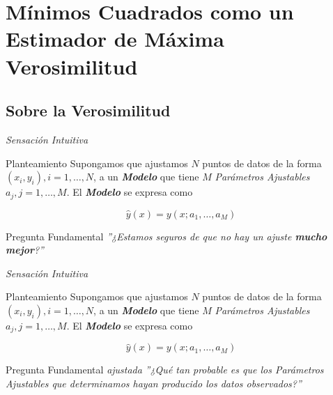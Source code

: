 \documentclass[11pt]{beamer}
\begin{document}
\section{Mínimos Cuadrados como un Estimador de Máxima Verosimilitud}
\begin{frame} 
\tableofcontents[currentsection] %
\end{frame}

\subsection{Sobre la Verosimilitud}
\begin{frame}{\textit{Sensación Intuitiva}}
\begin{block}{Planteamiento}
\small
Supongamos que ajustamos $N$ puntos de datos de la forma $(x_i,y_i), i = 1,\dots,N$, a un \textbf{\textit{Modelo}} que tiene $M$ \textit{Parámetros Ajustables} $a_j,j=1,\dots,M$. El \textbf{\textit{Modelo}} se expresa como

\begin{equation}
\hat{y}(x) = y(x;a_1,\dots,a_M)
\end{equation}

\end{block}

\begin{block}{Pregunta Fundamental}
\centering
\textit{''¿Estamos seguros de que no hay un ajuste \textbf{mucho mejor}?''}
\end{block}

\end{frame}

\begin{frame}{\textit{Sensación Intuitiva}}
\begin{block}{Planteamiento}
\small
Supongamos que ajustamos $N$ puntos de datos de la forma $(x_i,y_i), i = 1,\dots,N$, a un \textbf{\textit{Modelo}} que tiene $M$ \textit{Parámetros Ajustables} $a_j,j=1,\dots,M$. El \textbf{\textit{Modelo}} se expresa como

\begin{equation}
\hat{y}(x) = y(x;a_1,\dots,a_M)
\end{equation}

\end{block}

\begin{block}{Pregunta Fundamental \textit{ajustada}}
\centering
\textit{''¿Qué tan probable es que los Parámetros Ajustables que determinamos hayan producido los datos observados?''}
\end{block}

\end{frame}
\end{document}
